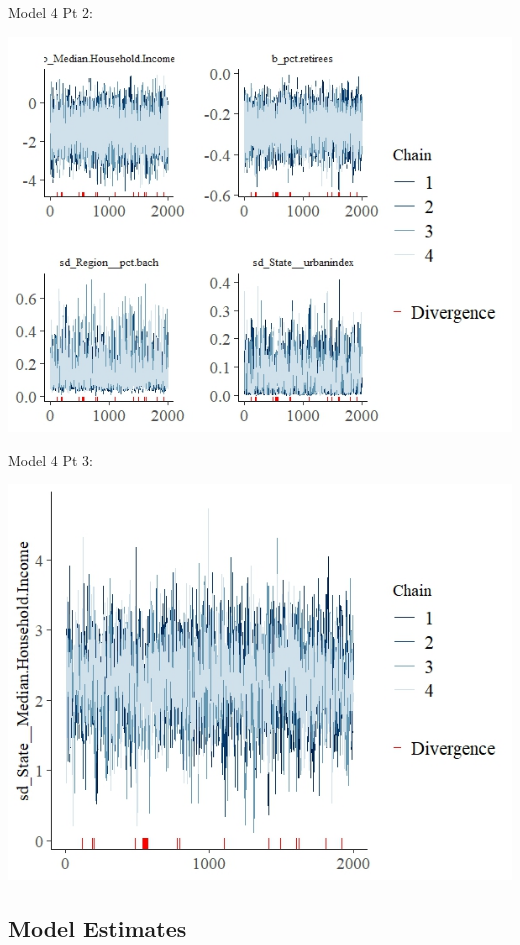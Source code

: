 \documentclass[12pt]{article}
\begin{document}
Model 4 Pt 2: 

\includegraphics[scale = 1.3]{trace_plots/trace_model4_part2.jpeg}

Model 4 Pt 3: 

\includegraphics[scale = 1.4]{trace_plots/trace_model4_part3.jpeg}


\FloatBarrier


\subsection*{Model Estimates}
\end{document}
